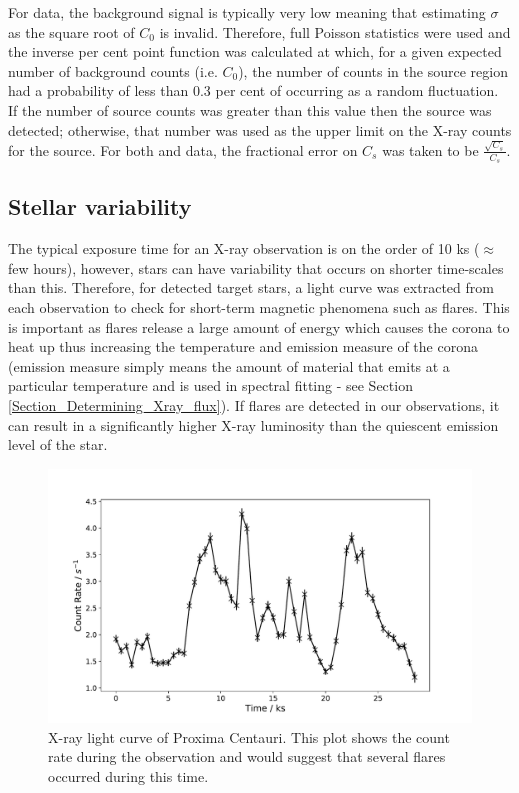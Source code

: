 For \Chandra data, the background signal is typically very low meaning that estimating $\sigma$ as the square root of $C_{0}$ is invalid. Therefore, full Poisson statistics were used and the inverse per cent point function was calculated at which, for a given expected number of background counts (i.e. $C_{0}$), the number of counts in the source region had a probability of less than 0.3 per cent of occurring as a random fluctuation. If the number of source counts was greater than this value then the source was detected; otherwise, that number was used as the upper limit on the X-ray counts for the source. For both \Chandra and \XMM data, the fractional error on $C_{s}$ was taken to be $\frac{\sqrt{C_{s}}}{C_{s}}$.

\subsection{Stellar variability}
The typical exposure time for an X-ray observation is on the order of 10 ks ($\approx$ few hours), however, stars can have variability that occurs on shorter time-scales than this. Therefore, for detected target stars, a light curve was extracted from each observation to check for short-term magnetic phenomena such as flares. This is important as flares release a large amount of energy which causes the corona to heat up thus increasing the temperature and emission measure of the corona (emission measure simply means the amount of material that emits at a particular temperature and is used in spectral fitting - see Section \ref{Section_Determining_Xray_flux}). If flares are detected in our observations, it can result in a significantly higher X-ray luminosity than the quiescent emission level of the star.

\begin{figure}
    \centering
    \includegraphics[scale=0.5]{Figures/3-Xray_age/proxima_cen_lc.pdf}
    \caption[X-ray light curve of Proxima Centauri]{X-ray light curve of Proxima Centauri. This plot shows the count rate during the observation and would suggest that several flares occurred during this time.}
    \label{fig:proxima_cen_lc}
\end{figure}


